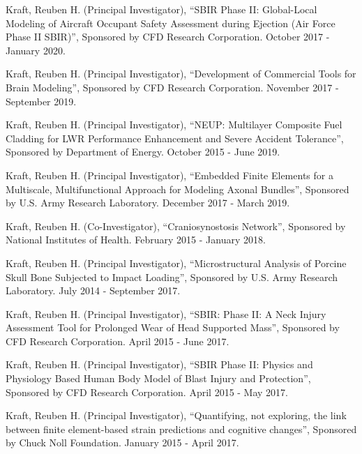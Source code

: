 \documentclass[a4paper,10pt]{article}
\begin{document}
\noindent Kraft, Reuben H. (Principal Investigator), ``SBIR Phase II: Global-Local Modeling of Aircraft Occupant Safety Assessment during Ejection (Air Force Phase II SBIR)'', Sponsored by CFD Research Corporation. October 2017 - January 2020.\vspace{0.25cm}

\noindent Kraft, Reuben H. (Principal Investigator), ``Development of Commercial Tools for Brain Modeling'', Sponsored by CFD Research Corporation. November 2017 - September 2019.\vspace{0.25cm}

\noindent Kraft, Reuben H. (Principal Investigator), ``NEUP: Multilayer Composite Fuel Cladding for LWR Performance Enhancement and Severe Accident Tolerance'', Sponsored by Department of Energy. October 2015 - June 2019.\vspace{0.25cm}

\noindent Kraft, Reuben H. (Principal Investigator), ``Embedded Finite Elements for a Multiscale, Multifunctional Approach for Modeling Axonal Bundles'', Sponsored by U.S. Army Research Laboratory. December 2017 - March 2019.\vspace{0.25cm}

\noindent Kraft, Reuben H. (Co-Investigator), ``Craniosynostosis Network'', Sponsored by National Institutes of Health. February 2015 - January 2018.\vspace{0.25cm}

\noindent Kraft, Reuben H. (Principal Investigator), ``Microstructural Analysis of Porcine Skull Bone Subjected to Impact Loading'', Sponsored by U.S. Army Research Laboratory. July 2014 - September 2017.\vspace{0.25cm}

\noindent Kraft, Reuben H. (Principal Investigator), ``SBIR: Phase II: A Neck Injury Assessment Tool for Prolonged Wear of Head Supported Mass'', Sponsored by CFD Research Corporation. April 2015 - June 2017.\vspace{0.25cm}

\noindent Kraft, Reuben H. (Principal Investigator), ``SBIR Phase II: Physics and Physiology Based Human Body Model of Blast Injury and Protection'', Sponsored by CFD Research Corporation. April 2015 - May 2017.\vspace{0.25cm}

\noindent Kraft, Reuben H. (Principal Investigator), ``Quantifying, not exploring, the link between finite element-based strain predictions and cognitive changes'', Sponsored by Chuck Noll Foundation. January 2015 - April 2017.\vspace{0.25cm}
\end{document}
